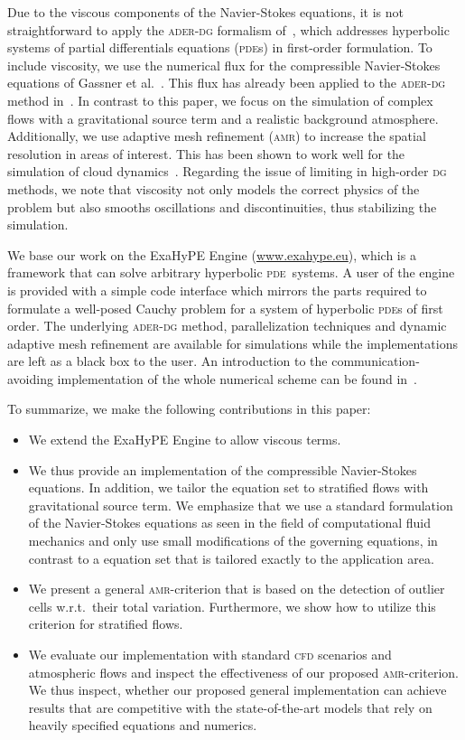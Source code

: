\documentclass[runningheads]{llncs}
\newcommand{\dg}{\textsc{dg}}
\newcommand{\aderdg}{\textsc{ader-dg}}
\newcommand{\amr}{\textsc{amr}}
\newcommand{\pde}{\textsc{pde}}
\newcommand{\softwareName}[1]{#1}
\newcommand{\exahypeengine}{\softwareName{ExaHyPE Engine}}
\begin{document}
Due to the viscous components of the Navier-Stokes equations, it is not straightforward to apply the \aderdg{} formalism of~\cite{dumbser2008unified}, which addresses hyperbolic systems of partial differentials equations (\pde{}s) in first-order formulation.
To include viscosity, we use the numerical flux for the compressible Navier-Stokes equations of Gassner et al.~\cite{gassner2008discontinuous}.
This flux has already been applied to the \aderdg{} method in~\cite{dumbser2010arbitrary}.
In contrast to this paper, we focus on the simulation of complex flows with a gravitational source term and a realistic background atmosphere.
Additionally, we use adaptive mesh refinement (\textsc{amr}) to increase the spatial resolution in areas of interest.
This has been shown to work well for the simulation of cloud dynamics~\cite{muller2010adaptive}.
Regarding the issue of limiting in high-order \dg{} methods, we note that viscosity not only models the correct physics of the problem but also smooths oscillations and discontinuities, thus stabilizing the simulation.

We base our work on the \exahypeengine{} (\url{www.exahype.eu}), which is a framework that can solve arbitrary hyperbolic \pde\ systems.
A user of the engine is provided with a simple code interface which mirrors the parts required to formulate a well-posed Cauchy problem for a system of hyperbolic \pde{}s of first order.
The underlying \aderdg{} method, parallelization techniques and dynamic adaptive mesh refinement are available for simulations while the implementations are left as a black box to the user.
An introduction to the communication-avoiding implementation of the whole numerical scheme can be found in~\cite{charrier2018stop}.

To summarize, we make the following contributions in this paper:%
\begin{itemize}%
\item We extend the \exahypeengine{} to allow viscous terms.
\item We thus provide an implementation of the compressible Navier-Stokes equations.
  In addition, we tailor the equation set to stratified flows with gravitational source term.
  We emphasize that we use a standard formulation of the Navier-Stokes equations as seen in the field of computational fluid mechanics and only use small modifications of the governing equations, in contrast to a equation set that is tailored exactly to the application area.
\item We present a general \textsc{amr}-criterion that is based on the detection of outlier cells w.r.t.\ their total variation.
  Furthermore, we show how to utilize this criterion for stratified flows.
\item We evaluate our implementation with standard \textsc{cfd} scenarios and atmospheric flows and inspect the effectiveness of our proposed \amr{}-criterion.
  We thus inspect, whether our proposed general implementation can achieve results that are competitive with the state-of-the-art models that rely on heavily specified equations and numerics.
\end{itemize}
%
\end{document}
